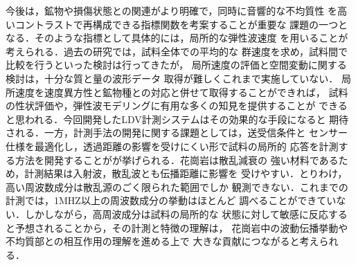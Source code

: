 ﻿\documentclass[11pt,a4j]{jarticle}
\begin{document}
今後は，鉱物や損傷状態との関連がより明確で，同時に音響的な不均質性
を高いコントラストで再構成できる指標関数を考案することが重要な
課題の一つとなる．そのような指標として具体的には，局所的な弾性波速度
を用いることが考えられる．過去の研究では，試料全体での平均的な
群速度を求め，試料間で比較を行うといった検討は行ってきたが，
局所速度の評価と空間変動に関する検討は，十分な質と量の波形データ
取得が難しくこれまで実施していない．
局所速度を速度異方性と鉱物種との対応と併せて取得することができれば，
試料の性状評価や，弾性波モデリングに有用な多くの知見を提供することが
できると思われる．今回開発したLDV計測システムはその効果的な手段になると
期待される．一方，計測手法の開発に関する課題としては，送受信条件と
センサー仕様を最適化し，透過距離の影響を受けにくい形で試料の局所的
応答を計測する方法を開発することがが挙げられる．花崗岩は散乱減衰の
強い材料であるため，計測結果は入射波，散乱波とも伝播距離に影響を
受けやすい．とりわけ，高い周波数成分は散乱源のごく限られた範囲でしか
観測できない．これまでの計測では，1MHZ以上の周波数成分の挙動はほとんど
調べることができていない．しかしながら，高周波成分は試料の局所的な
状態に対して敏感に反応すると予想されることから，その計測と特徴の理解は，
花崗岩中の波動伝播挙動や不均質部との相互作用の理解を進める上で
大きな貢献につながると考えられる．
\end{document}
